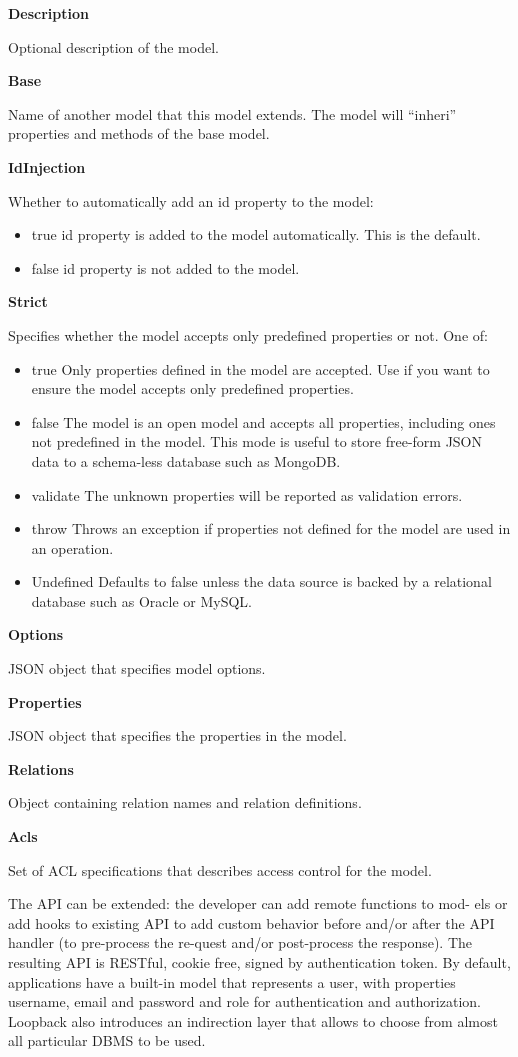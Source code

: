 \textbf{Description}

Optional description of the model.

\textbf{Base}

Name of another model that this model extends. The model will ``inheri'' properties and methods of the base model.

\textbf{IdInjection}

Whether to automatically add an id property to the model:
\begin{itemize}
\item true id property is added to the model automatically. This is the default.
\item false id property is not added to the model.
\end{itemize}

\textbf{Strict}

Specifies whether the model accepts only predefined properties or not. One of:
\begin{itemize}
\item true Only properties defined in the model are accepted. Use if you want to ensure the model accepts only predefined properties.
\item false The model is an open model and accepts all properties, including ones not predefined in the model. This mode is useful to store free-form JSON data to a schema-less database such as MongoDB.
\item validate The unknown properties will be reported as validation errors.
\item throw Throws an exception if properties not defined for the model are used in an operation.
\item Undefined Defaults to false unless the data source is backed by a relational database such as Oracle or MySQL.
\end{itemize}

\textbf{Options}

JSON object that specifies model options.

\textbf{Properties}

JSON object that specifies the properties in the model.

\textbf{Relations}

Object containing relation names and relation definitions.

\textbf{Acls}

Set of ACL specifications that describes access control for the model.

The API can be extended: the developer can add remote functions to mod- els or add hooks to existing API to add custom behavior before and/or after the API handler (to pre-process the re-quest and/or post-process the response). The resulting API is RESTful, cookie free, signed by authentication token. By default, applications have a built-in model that represents a user, with properties username, email and password and role for authentication and authorization. Loopback also introduces an indirection layer that allows to choose from almost all particular DBMS to be used.
